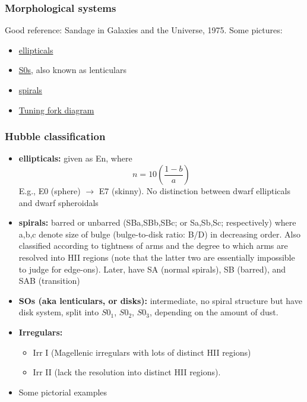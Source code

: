 \documentclass{article}
\begin{document}
\subsubsection{Morphological systems}
Good reference: Sandage in Galaxies and the Universe, 1975.
Some pictures:
\begin{itemize}
    \item \href{http://astronomy.nmsu.edu/holtz/a555/html/diagrams/a616/ellips.htm}
        {{ellipticals}}
    \item \href{http://astronomy.nmsu.edu/holtz/a555/html/diagrams/a616/s0.htm}
        {{S0s}}, also known as lenticulars
    \item \href{http://astronomy.nmsu.edu/holtz/a555/html/diagrams/a616/spirals.htm}
        {{spirals}}
    \item \href{http://astronomy.as.virginia.edu}
        {{Tuning fork diagram}}
\end{itemize}

\subsubsection{Hubble classification}
\begin{itemize}
    \item \textbf{ellipticals:} given as En, where
        \[
            n = 10(\frac{1-b}{a})
        \]
        E.g., E0 (sphere) $\rightarrow$ E7 (skinny).
        No distinction between dwarf ellipticals and dwarf spheroidals
    \item \textbf{spirals:} barred or unbarred (SBa,SBb,SBc; or Sa,Sb,Sc;
        respectively)
        where a,b,c denote size of bulge (bulge-to-disk ratio: B/D)
        in decreasing order. Also classified according to tightness of
        arms and the degree to which arms are resolved into HII regions
        (note that the latter two are essentially impossible to judge
        for edge-ons).
        Later, have SA (normal spirals), SB (barred), and SAB (transition)
    \item \textbf{SOs (aka lenticulars, or disks):} intermediate, no spiral
        structure but have disk system, split into $S0_1$, $S0_2$, $S0_3$,
        depending on the amount of dust.
    \item \textbf{Irregulars:}
        \begin{itemize}
            \item Irr I (Magellenic irregulars with lots of distinct HII regions)
            \item Irr II (lack the resolution into distinct HII regions).
        \end{itemize}
    \item Some pictorial examples
\end{itemize}
\end{document}
